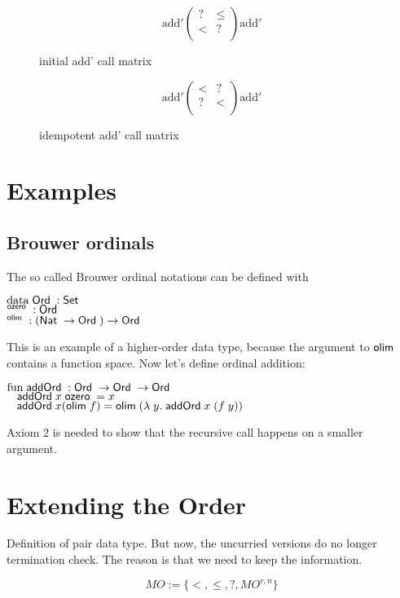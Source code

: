 \begin{figure}[p]

\[
\mathrm{add'} \begin{pmatrix}

? & \leq \\
< & ?   \\

\end{pmatrix} \mathrm{add'}
\]

\caption{initial add' call matrix}

\end{figure}

\begin{figure}[p]

\[
\mathrm{add'} \begin{pmatrix}

< & ?    \\
? & <    \\

\end{pmatrix} \mathrm{add'}
\] 

\caption{idempotent add' call matrix}

\end{figure}

\section{Examples}

\subsection{Brouwer ordinals}
The so called Brouwer ordinal notations can be defined with
\begin{bsp}
$\mathrm{data}\; \mathsf{Ord}\; : \mathsf{Set}$ \\
$\sp \mathsf{ozero}\; : \mathsf{Ord}\; $\\
$\sp \mathsf{olim}\; : (\mathsf{Nat}\; \rightarrow \mathsf{Ord}\; ) \rightarrow \mathsf{Ord}\; $
\end{bsp}
This is an example of a higher-order data type, because the argument to $\mathsf{olim}\;$ contains a function space.
Now let's define ordinal addition:
\begin{bsp}
$\mathrm{fun}\; \mathsf{addOrd}\; : \mathsf{Ord}\; \rightarrow \mathsf{Ord}\; \rightarrow \mathsf{Ord}\;$\\
$\hspace*{3mm} \mathsf{addOrd}\; x \; \mathsf{ozero}\; = x $\\
$\hspace*{3mm} \mathsf{addOrd}\; x (\mathsf{olim}\; f) = \mathsf{olim}\; ( \lambda\; y .\; \mathsf{addOrd}\;  x \; (f \; y))  $
\end{bsp}
Axiom 2 is needed to show that the recursive call happens on a smaller argument.
\section{Extending the Order}
Definition of pair data type.
But now, the uncurried versions do no longer termination check.
The reason is that we need to keep the information.
\begin{definition}[MOrder]
\[ MO := \{ < , \leq , ? , MO^{r,n}\} \]
\end{definition}

